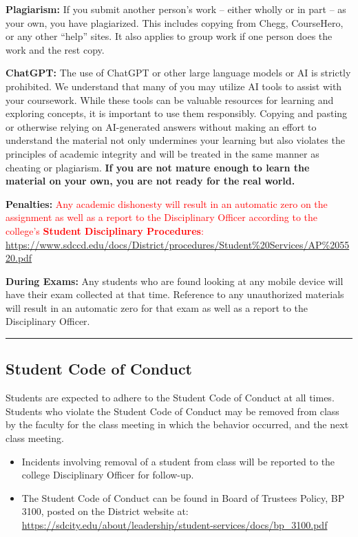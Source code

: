 \documentclass[12pt]{article}
\begin{document}
\medskip
\noindent
\textbf{Plagiarism:} 
If you submit another person’s work -- either wholly or in part -- as your own, you have plagiarized. 
This includes copying from Chegg, CourseHero, or any other ``help'' sites. 
It also applies to group work if one person does the work and the rest copy.

\medskip
\noindent
\textbf{ChatGPT:}
The use of ChatGPT or other large language models or AI is strictly prohibited. 
We understand that many of you may utilize AI tools to assist with your coursework. 
While these tools can be valuable resources for learning and exploring concepts, it is important to use them responsibly. 
Copying and pasting or otherwise relying on AI-generated answers without making an effort to understand the material not only undermines your learning but also violates the principles of academic integrity and will be treated in the same manner as cheating or plagiarism. 
\textbf{If you are not mature enough to learn the material on your own, you are not ready for the real world.}

\medskip
\noindent
\textbf{Penalties:} 
\textcolor{red}{Any academic dishonesty will result in an automatic zero on the assignment as well as a report to the Disciplinary Officer according to the college's \textbf{Student Disciplinary Procedures}:}
\url{https://www.sdccd.edu/docs/District/procedures/Student%20Services/AP%205520.pdf}

\medskip
\noindent
\textbf{During Exams:} 
Any students who are found looking at any mobile device will have their exam collected at that time.
Reference to any unauthorized materials will result in an automatic zero for that exam as well as a report to the Disciplinary Officer.

\medskip
\hrule

\subsection*{Student Code of Conduct}
Students are expected to adhere to the Student Code of Conduct at all times. 
Students who violate the Student Code of Conduct may be removed from class by the faculty for the class meeting in which the behavior occurred, and the next class meeting.
\begin{itemize}[leftmargin=2em]
    \item Incidents involving removal of a student from class will be reported to the college Disciplinary Officer for follow-up.
    \item The Student Code of Conduct can be found in Board of Trustees Policy, BP 3100, posted on the District website at:
    \url{https://sdcity.edu/about/leadership/student-services/docs/bp_3100.pdf}
\end{itemize}
\end{document}
